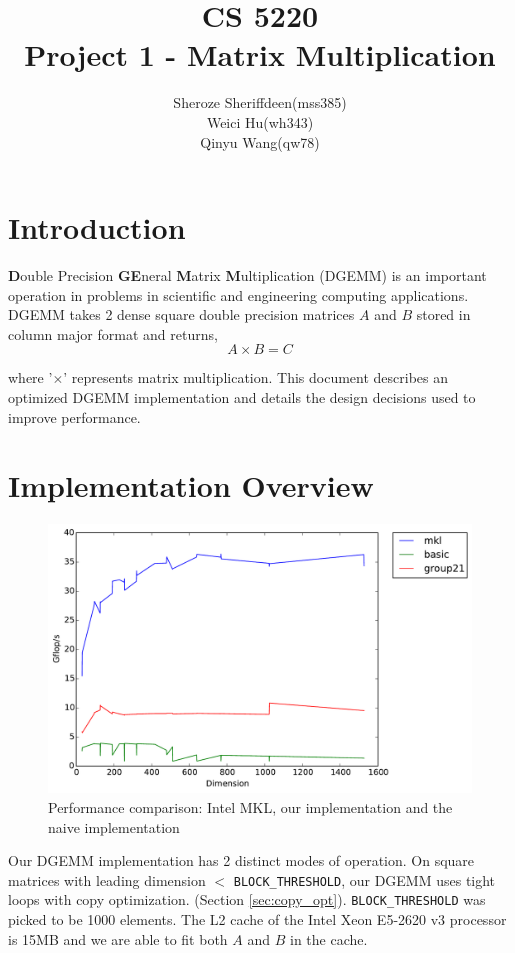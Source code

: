 \documentclass[11pt]{article}
\begin{document}
\title{CS 5220\\ Project 1 - Matrix Multiplication}
\author{Sheroze Sheriffdeen(mss385)\\ Weici Hu(wh343)\\  Qinyu Wang(qw78)}
\maketitle

\section{Introduction}
\textbf{D}ouble Precision \textbf{GE}neral \textbf{M}atrix \textbf{M}ultiplication (DGEMM) is an important operation in problems in scientific and engineering computing applications. DGEMM takes 2 dense square double precision matrices $A$ and $B$ stored in column major format and returns,
	\begin{equation} 
		A \times B = C
	\end{equation}
	
	where '$\times$' represents matrix multiplication. This document describes an optimized DGEMM implementation and details the design decisions used to improve performance. 

\section{Implementation Overview}
\begin{figure}[H]
\centering
\includegraphics[scale=0.6]{growth_final.pdf}
\caption{Performance comparison: Intel MKL, our implementation and the naive implementation}
\end{figure}
\newpage
Our DGEMM implementation has 2 distinct modes of operation. On square matrices with leading dimension $<$ \texttt{BLOCK\_THRESHOLD}, our DGEMM uses tight loops with copy optimization. (Section \ref{sec:copy_opt}). \texttt{BLOCK\_THRESHOLD} was picked to be 1000 elements. The L2 cache of the  Intel Xeon E5-2620 v3 processor is 15MB and we are able to fit both $A$ and $B$ in the cache. \\
\end{document}

